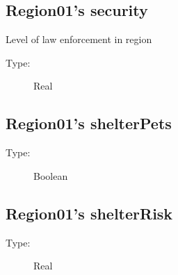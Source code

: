 \documentclass{article}%
\begin{document}
%
\subsection{Region01's security}%
\label{subsec:Region01's security}%
Level of law enforcement in region%
\begin{description}%
\item[Type:]%
Real%
\end{description}

%
\subsection{Region01's shelterPets}%
\label{subsec:Region01's shelterPets}%
\begin{description}%
\item[Type:]%
Boolean%
\end{description}

%
\subsection{Region01's shelterRisk}%
\label{subsec:Region01's shelterRisk}%
\begin{description}%
\item[Type:]%
Real%
\end{description}%
\end{document}
